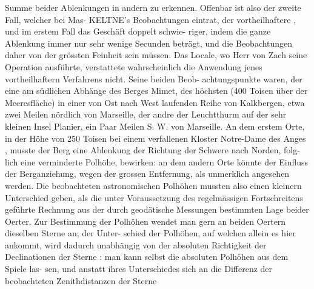 \documentclass[12pt,a4paper]{article}
\begin{document}
Summe beider Ablenkungen in andern zu erkennen. Offenbar ist also der zweite Fall, welcher bei Mas-\newline
KELTNE's Beobachtungen eintrat, der vortheilhaftere , und im erstem Fall das Geschäft doppelt schwie-\newline
riger, indem die ganze Ablenkung immer nur sehr wenige Secunden beträgt, und die Beobachtungen\newline
daher von der grössten Feinheit sein müssen. Das Locale, wo Herr von Zach seine Operation ausführte,\newline
verstattete wahrscheinlich die Anwendung jenes vortheilhaftern Verfahrens nicht. Seine beiden Beob-\newline
achtungspunkte waren, der eine am südlichen Abhänge des Berges Mimet, des höchsten (400 Toisen\newline
über der Meeresfläche) in einer von Ost nach West laufenden Reihe von Kalkbergen, etwa zwei Meilen\newline
nördlich von Marseille, der andre der Leuchtthurm auf der sehr kleinen Insel Planier, ein Paar Meilen\newline
S. W. von Marseille. An dem erstem Orte, in der Höhe von 250 Toisen bei einem verfallenen Kloster\newline
Notre-Dame des Anges , musste der Berg eine Ablenkung der Richtung der Schwere nach Norden, folg-\newline
lich eine verminderte Polhöhe, bewirken: an dem andern Orte könnte der Einfluss der Berganziehung,\newline
wegen der grossen Entfernung, als unmerklich angesehen werden. Die beobachteten astronomischen\newline
Polhöhen mussten also einen kleinern Unterschied geben, als die unter Voraussetzung des regelmässigen\newline
Fortschreitens geführte Rechnung aus der durch geodätische Messungen bestimmten Lage beider Oerter.\newline
Zur Bestimmung der Polhöhen wendet man gern an beiden Oertern dieselben Sterne an; der Unter-\newline
schied der Polhöhen, auf welchen allein es hier ankommt, wird dadurch unabhängig von der absoluten\newline
Richtigkeit der Declinationen der Sterne : man kann selbst die absoluten Polhöhen aus dem Spiele las-\newline
sen, und anstatt ihres Unterschiedes sich an die Differenz der beobachteten Zenithdistanzen der Sterne\newline
\end{document}

